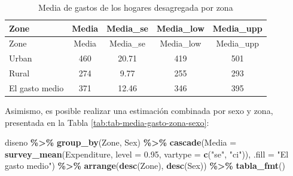 \documentclass[
  spanish,
  12pt,
]{book}
\newenvironment{Shaded}{\begin{snugshade}}{\end{snugshade}}
\newcommand{\AttributeTok}[1]{\textcolor[rgb]{0.13,0.29,0.53}{#1}}
\newcommand{\FloatTok}[1]{\textcolor[rgb]{0.00,0.00,0.81}{#1}}
\newcommand{\FunctionTok}[1]{\textcolor[rgb]{0.13,0.29,0.53}{\textbf{#1}}}
\newcommand{\NormalTok}[1]{#1}
\newcommand{\SpecialCharTok}[1]{\textcolor[rgb]{0.81,0.36,0.00}{\textbf{#1}}}
\newcommand{\StringTok}[1]{\textcolor[rgb]{0.31,0.60,0.02}{#1}}
\begin{document}
\begin{longtable}[]{@{}lcccc@{}}
\caption{\label{tab:tab-media-gasto-zona}Media de gastos de los hogares desagregada por zona}\tabularnewline
\toprule\noalign{}
Zone & Media & Media\_se & Media\_low & Media\_upp \\
\midrule\noalign{}
\endfirsthead
\toprule\noalign{}
Zone & Media & Media\_se & Media\_low & Media\_upp \\
\midrule\noalign{}
\endhead
\bottomrule\noalign{}
\endlastfoot
Urban & 460 & 20.71 & 419 & 501 \\
Rural & 274 & 9.77 & 255 & 293 \\
El gasto medio & 371 & 12.46 & 346 & 395 \\
\end{longtable}

Asimismo, es posible realizar una estimación combinada por sexo y zona, presentada en la Tabla \ref{tab:tab-media-gasto-zona-sexo}:

\begin{Shaded}
\begin{Highlighting}[]
\NormalTok{diseno }\SpecialCharTok{\%\textgreater{}\%} 
  \FunctionTok{group\_by}\NormalTok{(Zone, Sex) }\SpecialCharTok{\%\textgreater{}\%}
  \FunctionTok{cascade}\NormalTok{(}\AttributeTok{Media =} \FunctionTok{survey\_mean}\NormalTok{(Expenditure, }
                              \AttributeTok{level =} \FloatTok{0.95}\NormalTok{,}
                              \AttributeTok{vartype =}  \FunctionTok{c}\NormalTok{(}\StringTok{"se"}\NormalTok{, }\StringTok{"ci"}\NormalTok{)),}
        \AttributeTok{.fill =} \StringTok{"El gasto medio"}\NormalTok{) }\SpecialCharTok{\%\textgreater{}\%}
  \FunctionTok{arrange}\NormalTok{(}\FunctionTok{desc}\NormalTok{(Zone), }\FunctionTok{desc}\NormalTok{(Sex)) }\SpecialCharTok{\%\textgreater{}\%}
  \FunctionTok{tabla\_fmt}\NormalTok{()}
\end{Highlighting}
\end{Shaded}
\end{document}
